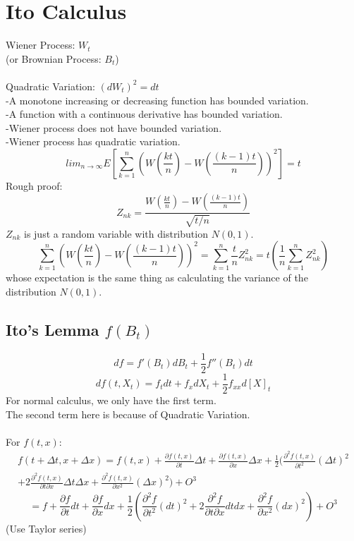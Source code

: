 \documentclass[12pt]{article}
\begin{document}
\section{Ito Calculus}
Wiener Process: $W_t$\\
(or Brownian Process: $B_t$)\\
\\
Quadratic Variation: $(dW_t)^2=dt$\\
-A monotone increasing or decreasing function has bounded variation.\\
-A function with a continuous derivative has bounded variation.\\
-Wiener process does not have bounded variation.\\
-Wiener process has quadratic variation.\\
$$lim_{n\rightarrow\infty}E[\sum_{k=1}^n (W(\frac{kt}{n})-W(\frac{(k-1)t}{n}))^2]=t$$
Rough proof:
$$Z_{nk}=\frac{W(\frac{kt}{n})-W(\frac{(k-1)t}{n})}{\sqrt{t/n}}$$
$Z_{nk}$ is just a random variable with distribution $N(0,1)$.
$$\sum_{k=1}^n (W(\frac{kt}{n})-W(\frac{(k-1)t}{n}))^2=\sum_{k=1}^{n}\frac{t}{n}Z_{nk}^2=t(\frac{1}{n}\sum_{k=1}^{n}Z_{nk}^2)$$
whose expectation is the same thing as calculating the variance of the distribution $N(0,1)$.

\subsection{Ito's Lemma $f(B_t)$}
$$df=f'(B_t)dB_t + \frac{1}{2}f''(B_t)dt$$
$$df(t,X_t)=f_t dt + f_x dX_t+\frac{1}{2}f_{xx}d[X]_t$$
For normal calculus, we only have the first term.\\
The second term here is because of Quadratic Variation.\\
\\
For $f(t,x)$:\\
\begin{multline*}
f(t+\Delta t,x+\Delta x)=f(t,x)+\frac{\partial f(t,x)}{\partial t}\Delta t+\frac{\partial f(t,x)}{\partial x}\Delta x+\frac{1}{2}(\frac{\partial^2 f(t,x)}{\partial t^2}(\Delta t)^2\\
+2\frac{\partial^2 f(t,x)}{\partial t\partial x}\Delta t \Delta x + \frac{\partial^2 f(t,x)}{\partial x^2}(\Delta x)^2)+O^3
\end{multline*}
$$=f + \frac{\partial f}{\partial t}dt + \frac{\partial f}{\partial x}dx + \frac{1}{2}(\frac{\partial^2 f}{\partial t^2}(dt)^2 + 2\frac{\partial^2 f}{\partial t \partial x}dtdx + \frac{\partial^2 f}{\partial x^2}(dx)^2) + O^3$$
(Use Taylor series)\\
\\
\end{document}
